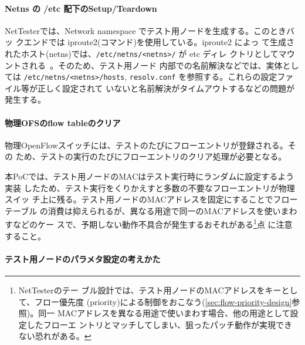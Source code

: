     \paragraph{Netns の /etc 配下のSetup/Teardown}

NetTesterでは、Network namespace でテスト用ノードを生成する。このときバッ
クエンドでは iproute2(コマンド)を使用している。iproute2 によっ
て生成されたホスト(netns)では、\verb|/etc/netns/<netns>/| が etc ディレ
クトリとしてマウントされる~\cite{iproute2-doc}。そのため、テスト用ノード
内部での名前解決などでは、実体としては \verb|/etc/netns/<netns>/hosts|,
\verb|resolv.conf| を参照する。これらの設定ファイル等が正しく設定されて
いないと名前解決がタイムアウトするなどの問題が発生する。

    \paragraph{物理OFSのflow tableのクリア}
物理OpenFlowスイッチには、テストのたびにフローエントリが登録される。その
ため、テストの実行のたびにフローエントリのクリア処理が必要となる。

本PoCでは、テスト用ノードのMACはテスト実行時にランダムに設定するよう実装
したため、テスト実行をくりかえすと多数の不要なフローエントリが物理スイッ
チ上に残る。テスト用ノードのMACアドレスを固定にすることでフローテーブル
の消費は抑えられるが、異なる用途で同一のMACアドレスを使いまわすなどのケー
スで、予期しない動作不具合が発生するおそれがある\footnote{NetTesterのテー
ブル設計では、テスト用ノードのMACアドレスをキーとして、フロー優先度
(priority)による制御をおこなう(\ref{sec:flow-priority-design}参照)。同一
MACアドレスを異なる用途で使いまわす場合、他の用途として設定したフローエ
ントリとマッチしてしまい、狙ったパッチ動作が実現できない恐れがある。}点
に注意すること。

    \paragraph{テスト用ノードのパラメタ設定の考えかた}

